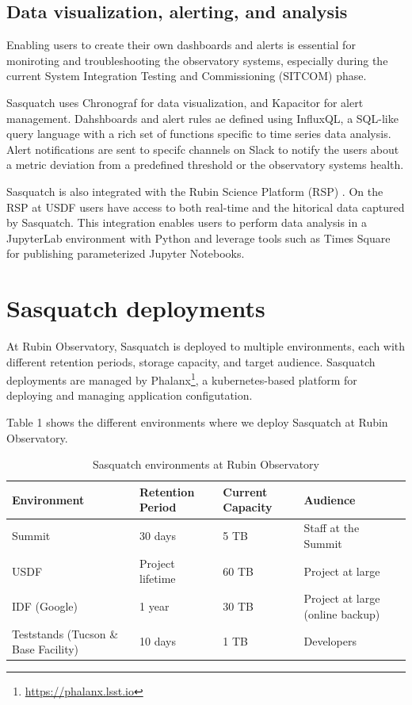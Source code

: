 \subsection{Data visualization, alerting, and analysis}

Enabling users to create their own dashboards and alerts is essential for moniroting and troubleshooting the observatory systems, especially during the current System Integration Testing and Commissioning (SITCOM) phase.

Sasquatch uses Chronograf for data visualization, and Kapacitor for alert management. Dahshboards and alert rules ae defined using InfluxQL, a SQL-like query language with a rich set of functions specific to time series data analysis. Alert notifications are sent to specifc channels on Slack to notify the users about a metric deviation from a predefined threshold or the observatory systems health.

Sasquatch is also integrated with the Rubin Science Platform (RSP) \cite{DMTN-082, DMTN-212}. On the RSP at USDF users have access to both real-time and the hitorical data captured by Sasquatch. This integration enables users to perform data analysis in a JupyterLab environment with Python and leverage tools such as Times Square \cite{SQR-062} for publishing parameterized Jupyter Notebooks.

\section{Sasquatch deployments}
\label{sec:deploy}

At Rubin Observatory, Sasquatch is deployed to multiple environments, each with different retention periods, storage capacity, and target audience. Sasquatch deployments are managed by Phalanx\footnote{\url{https://phalanx.lsst.io}}, a kubernetes-based platform for deploying and managing application configutation.

Table 1 shows the different environments where we deploy Sasquatch at Rubin Observatory.

\begin{table}[ht]
    \small
    \centering
    \caption{Sasquatch environments at Rubin Observatory}
    \begin{tabular}{@{}llll@{}}
        \toprule
        \textbf{Environment} & \textbf{Retention Period} & \textbf{Current Capacity} & \textbf{Audience} \\
        \midrule
        Summit & 30 days & 5 TB & Staff at the Summit \\
        USDF & Project lifetime & 60 TB & Project at large \\
        IDF (Google) & 1 year & 30 TB & Project at large (online backup) \\
        Teststands (Tucson \& Base Facility) & 10 days & 1 TB & Developers \\
        \bottomrule
    \end{tabular}
\end{table}

